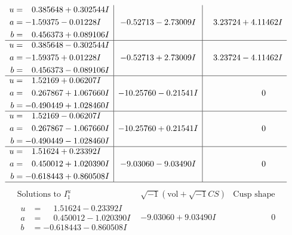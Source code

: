 \documentclass[1p]{elsarticle_modified}
\theoremstyle{definition}
\newcommand{\I}{\sqrt{-1}}
\begin{document}
$$\begin{array}{c|c|c}
\begin{aligned}
u &= \phantom{-}0.385648 + 0.302544 I \\
a &= -1.59375 - 0.01228 I \\
b &= \phantom{-}0.456373 + 0.089106 I\end{aligned}
 & -0.52713 - 2.73009 I & \phantom{-}3.23724 + 4.11462 I \\ \hline\begin{aligned}
u &= \phantom{-}0.385648 - 0.302544 I \\
a &= -1.59375 + 0.01228 I \\
b &= \phantom{-}0.456373 - 0.089106 I\end{aligned}
 & -0.52713 + 2.73009 I & \phantom{-}3.23724 - 4.11462 I \\ \hline\begin{aligned}
u &= \phantom{-}1.52169 + 0.06207 I \\
a &= \phantom{-}0.267867 + 1.067660 I \\
b &= -0.490449 + 1.028460 I\end{aligned}
 & -10.25760 - 0.21541 I & \phantom{-0.000000 } 0 \\ \hline\begin{aligned}
u &= \phantom{-}1.52169 - 0.06207 I \\
a &= \phantom{-}0.267867 - 1.067660 I \\
b &= -0.490449 - 1.028460 I\end{aligned}
 & -10.25760 + 0.21541 I & \phantom{-0.000000 } 0 \\ \hline\begin{aligned}
u &= \phantom{-}1.51624 + 0.23392 I \\
a &= \phantom{-}0.450012 + 1.020390 I \\
b &= -0.618443 + 0.860508 I\end{aligned}
 & -9.03060 - 9.03490 I & \phantom{-0.000000 } 0\\
 \hline 
 \end{array}$$\newpage$$\begin{array}{c|c|c}  
\text{Solutions to }I^u_{1}& \I (\text{vol} + \sqrt{-1}CS) & \text{Cusp shape}\\
 \hline 
\begin{aligned}
u &= \phantom{-}1.51624 - 0.23392 I \\
a &= \phantom{-}0.450012 - 1.020390 I \\
b &= -0.618443 - 0.860508 I\end{aligned}
 & -9.03060 + 9.03490 I & \phantom{-0.000000 } 0 \\ \hline\begin{aligned}

\end{aligned}
\end{array}$$
\end{document}
